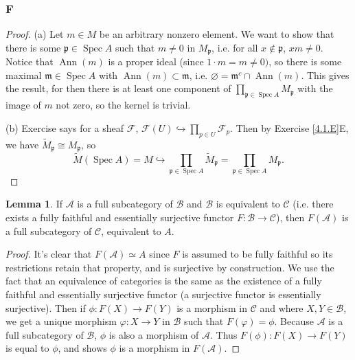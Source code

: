\documentclass{article}
\newcommand{\fA}{\mathscr{A}}
\newcommand{\fB}{\mathscr{B}}
\newcommand{\fC}{\mathscr{C}}
\newcommand{\fF}{\mathscr{F}}
\newcommand{\frkm}{\mathfrak{m}}
\newcommand{\frkp}{\mathfrak{p}}
\DeclareMathOperator{\Ann}{\mathrm{Ann}}
\DeclareMathOperator{\Spec}{\mathrm{Spec}}
\let\emptyset\varnothing
\theoremstyle{definition} %
\newtheorem{lemma}[theorem]{Lemma}
\begin{document}
\subsubsection{F}\label{4.1.F}
\begin{proof}
    \noindent(a) Let $m\in M$ be an arbitrary nonzero element. We want to show that there is some $\frkp \in \Spec A$ such that $m\ne 0$ in $M_\frkp$, i.e. for all $x\notin \frkp$, $xm \ne 0$. Notice that $\Ann(m)$ is a proper ideal (since $1\cdot m=m \ne 0)$, so there is some maximal $\frkm \in \Spec A$ with $\Ann(m)\subset \frkm$, i.e. $\emptyset = \frkm^c \cap \Ann(m)$. This gives the result, for then there is at least one component of $\prod_{\frkp \in \Spec A} M_\frkp$ with the image of $m$ not zero, so the kernel is trivial.

    \noindent (b) Exercise %
    says for a sheaf $\fF$, $\fF(U) \hookrightarrow \prod_{p \in U} \fF_p$. Then by Exercise \ref{4.1.E}E, we have $\widetilde M_\frkp \cong M_\frkp$, so 
    \[
    \widetilde M(\Spec A) = M \hookrightarrow \prod_{\frkp \in \Spec A} \widetilde M_\frkp = \prod_{\frkp \in \Spec A} M_\frkp.
    \]
\end{proof}
\begin{lemma}\label{lem:equivalences preserve fullness}
        If $\fA$ is a full subcategory of $\fB$ and $\fB$ is equivalent to $\fC$ (i.e. there exists a fully faithful and essentially surjective functor $F:\fB\to \fC$), then $F(\fA)$ is a full subcategory of $\fC$, equivalent to $A$.
    \end{lemma}
    \begin{proof}
       It's clear that $F(\fA) \simeq A$ since $F$ is assumed to be fully faithful so its restrictions retain that property, and is surjective by construction. We use the fact that an equivalence of categories is the same as the existence of a fully faithful and essentially surjective functor (a surjective functor is essentially surjective). Then if $\phi: F(X)\to F(Y)$ is a morphism in $\fC$ and where $X,Y\in \fB$, we get a unique morphism $\varphi:X\to Y$ in $\fB$ such that $F(\varphi)=\phi$. Because $\fA$ is a full subcategory of $\fB$, $\phi$ is also a morphism of $\fA$. Thus $F(\phi):F(X)\to F(Y)$ is equal to $\phi$, and shows $\phi$ is a morphism in $F(\fA)$.
    \end{proof}
\end{document}
